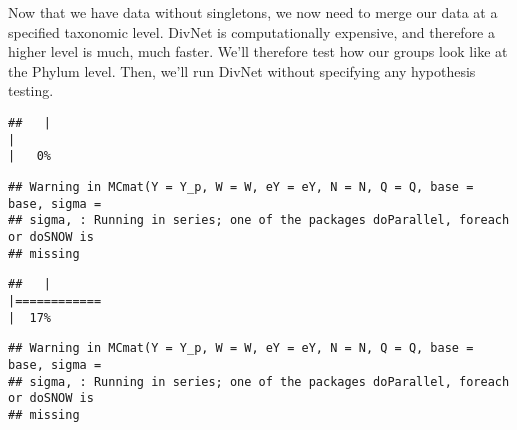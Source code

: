 \documentclass[]{article}
\newenvironment{Shaded}{\begin{snugshade}}{\end{snugshade}}
\newcommand{\CharTok}[1]{\textcolor[rgb]{0.31,0.60,0.02}{#1}}
\newcommand{\CommentTok}[1]{\textcolor[rgb]{0.56,0.35,0.01}{\textit{#1}}}
\newcommand{\DataTypeTok}[1]{\textcolor[rgb]{0.13,0.29,0.53}{#1}}
\newcommand{\DecValTok}[1]{\textcolor[rgb]{0.00,0.00,0.81}{#1}}
\newcommand{\KeywordTok}[1]{\textcolor[rgb]{0.13,0.29,0.53}{\textbf{#1}}}
\newcommand{\NormalTok}[1]{#1}
\newcommand{\OperatorTok}[1]{\textcolor[rgb]{0.81,0.36,0.00}{\textbf{#1}}}
\newcommand{\StringTok}[1]{\textcolor[rgb]{0.31,0.60,0.02}{#1}}
\begin{document}
Now that we have data without singletons, we now need to merge our data
at a specified taxonomic level. DivNet is computationally expensive, and
therefore a higher level is much, much faster. We'll therefore test how
our groups look like at the Phylum level. Then, we'll run DivNet without
specifying any hypothesis testing.

\begin{Shaded}
\end{Shaded}

\begin{verbatim}
##   |                                                                              |                                                                      |   0%
\end{verbatim}

\begin{verbatim}
## Warning in MCmat(Y = Y_p, W = W, eY = eY, N = N, Q = Q, base = base, sigma =
## sigma, : Running in series; one of the packages doParallel, foreach or doSNOW is
## missing
\end{verbatim}

\begin{verbatim}
##   |                                                                              |============                                                          |  17%
\end{verbatim}

\begin{verbatim}
## Warning in MCmat(Y = Y_p, W = W, eY = eY, N = N, Q = Q, base = base, sigma =
## sigma, : Running in series; one of the packages doParallel, foreach or doSNOW is
## missing
\end{verbatim}
\end{document}

